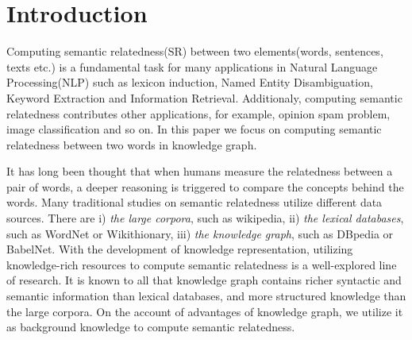 \section{Introduction}
Computing semantic relatedness(SR) between two elements(words, sentences,
texts etc.) is a fundamental task for many applications in Natural Language
Processing(NLP) such as lexicon induction\cite{aaai/QadirMGL15}, Named 
Entity Disambiguation\cite{acl/HanZ10}, Keyword Extraction
\cite{ijcai/ZhangFW13} and Information Retrieval\cite{acl/GurevychMZ07}. 
Additionaly, computing semantic relatedness contributes other applications, 
for example, opinion spam problem\cite{www/SandulescuE15}, image classification\cite{iwcs/LeongM11} and so on. 
In this paper we focus on computing semantic relatedness between two 
words in knowledge graph.

It has long been thought that when humans measure the relatedness between
a pair of words, a deeper reasoning is triggered to compare the concepts
behind the words. Many traditional studies on semantic relatedness
utilize different data sources. There are
i) \emph{the large corpora}, such as wikipedia\cite{ijcai/GabrilovichM07},
ii) \emph{the lexical databases}, such as WordNet\cite{acl/Pucher07} or Wikithionary\cite{aaai/ZeschMG08}, 
iii) \emph{the knowledge graph}, such as DBpedia\cite{aaai/NavigliP12} or BabelNet\cite{aaai/NavigliP12}.
With the development of knowledge representation, utilizing knowledge-rich resources to compute semantic 
relatedness is a well-explored line of research. It is known to all that
knowledge graph contains richer syntactic and semantic information than lexical databases,
and more structured knowledge than the large corpora.
On the account of advantages of knowledge graph, we utilize it as background 
knowledge to compute semantic relatedness.


